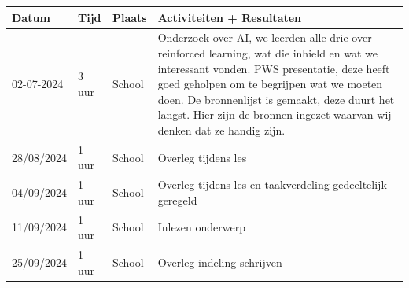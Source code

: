 \documentclass[a4paper,11pt]{report}-
\begin{document}
\begin{longtable}{|p{}|p{}|p{}|p{}|}
    \hline
    \textbf{Datum} & \textbf{Tijd} & \textbf{Plaats} & \textbf{Activiteiten + Resultaten}                                                                                                                                                                                                                                                                                   \\
    \hline
    02-07-2024     & 3 uur         & School          & Onderzoek over AI, we leerden alle drie over reinforced learning, wat die inhield en wat we interessant vonden. PWS presentatie, deze heeft goed geholpen om te begrijpen wat we moeten doen. De bronnenlijst is gemaakt, deze duurt het langst. Hier zijn de bronnen ingezet waarvan wij denken dat ze handig zijn. \\
    \hline
    28/08/2024     & 1 uur         & School          & Overleg tijdens les                                                                                                                                                                                                                                                                                                  \\
    \hline
    04/09/2024     & 1 uur         & School          & Overleg tijdens les en taakverdeling gedeeltelijk geregeld                                                                                                                                                                                                                                                           \\
    \hline
    11/09/2024     & 1 uur         & School          & Inlezen onderwerp                                                                                                                                                                                                                                                                                                    \\
    \hline
    25/09/2024     & 1 uur         & School          & Overleg indeling schrijven                                                                                                                                                                                                                                                                                           \\

\end{longtable}
\end{document}
